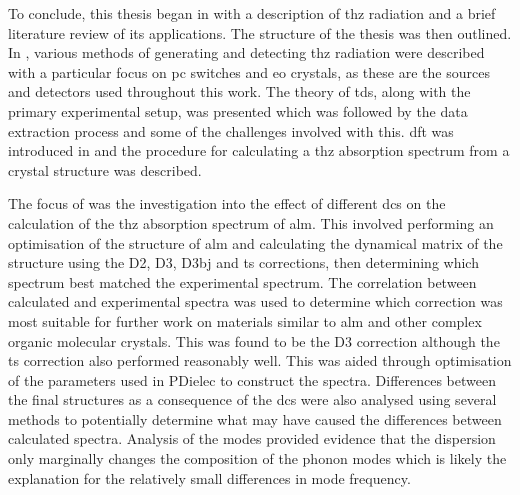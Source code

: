 To conclude, this thesis began in  with a description of \acrshort{thz} radiation and a brief literature review of its applications. The structure of the thesis was then outlined. In , various methods of generating and detecting \acrshort{thz} radiation were described with a particular focus on \acrshort{pc} switches and \acrshort{eo} crystals, as these are the sources and detectors used throughout this work. The theory of \acrshort{tds}, along with the primary experimental setup, was presented which was followed by the data extraction process and some of the challenges involved with this. \acrshort{dft} was introduced in  and the procedure for calculating a \acrshort{thz} absorption spectrum from a crystal structure was described.

The focus of  was the investigation into the effect of different \acrshort{dc}s on the calculation of the \acrshort{thz} absorption spectrum of \acrshort{alm}. This involved performing an optimisation of the structure of \acrshort{alm} and calculating the dynamical matrix of the structure using the D2, D3, D3\acrshort{bj} and \acrshort{ts} corrections, then determining which spectrum best matched the experimental spectrum. The correlation between calculated and experimental spectra was used to determine which correction was most suitable for further work on materials similar to \acrshort{alm} and other complex organic molecular crystals. This was found to be the D3 correction although the \acrshort{ts} correction also performed reasonably well. This was aided through optimisation of the parameters used in PDielec to construct the spectra. Differences between the final structures as a consequence of the \acrshort{dc}s were also analysed using several methods to potentially determine what may have caused the differences between calculated spectra. Analysis of the modes provided evidence that the dispersion only marginally changes the composition of the phonon modes which is likely the explanation for the relatively small differences in mode frequency.

